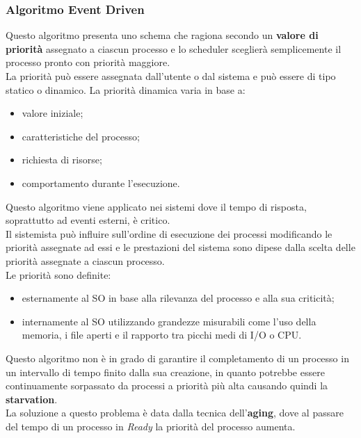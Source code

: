 \documentclass[12pt, letterpaper]{report}
\begin{document}
	\subsubsection{Algoritmo Event Driven}
	Questo algoritmo presenta uno schema che ragiona secondo un \textbf{valore di priorità} assegnato a ciascun processo e lo scheduler sceglierà semplicemente il processo pronto con priorità maggiore. \\
	La priorità può essere assegnata dall'utente o dal sistema e può essere di tipo statico o dinamico. La priorità dinamica varia in base a:
	\begin{itemize}
		\item valore iniziale;
		\item caratteristiche del processo;
		\item richiesta di risorse;
		\item comportamento durante l'esecuzione.
	\end{itemize}
	Questo algoritmo viene applicato nei sistemi dove il tempo di risposta, soprattutto ad eventi esterni, è critico. \\
	Il sistemista può influire sull'ordine di esecuzione dei processi modificando le priorità assegnate ad essi e le prestazioni del sistema sono dipese dalla scelta delle priorità assegnate a ciascun processo. \\
	Le priorità sono definite:
	\begin{itemize}
		\item esternamente al SO in base alla rilevanza del processo e alla sua criticità;
		\item internamente al SO utilizzando grandezze misurabili come l'uso della memoria, i file aperti e il rapporto tra picchi medi di I/O o CPU.
	\end{itemize}
	Questo algoritmo non è in grado di garantire il completamento di un processo in un intervallo di tempo finito dalla sua creazione, in quanto potrebbe essere continuamente sorpassato da processi a priorità più alta causando quindi la \textbf{starvation}. \\
	La soluzione a questo problema è data dalla tecnica dell'\textbf{aging}, dove al passare del tempo di un processo in \textit{Ready} la priorità del processo aumenta.
\end{document}
